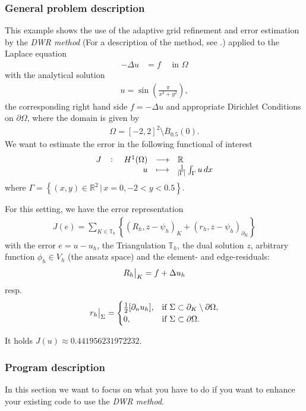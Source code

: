 \subsubsection{General problem description}
This example shows the use of the adaptive grid refinement and error estimation by the \textit{DWR method} (For a description of the method, see \cite{BR03}.) applied to the Laplace equation 
\begin{align*}
-\Delta u &= f \quad\text{ in } \Omega
\end{align*}
with the analytical solution
\begin{align*}
u = \sin\left(\frac{\pi}{x^2 + y^2}\right),
\end{align*}
 the corresponding right hand side $f = -\Delta u$ and appropriate Dirichlet Conditions on $\partial \Omega$, where the domain is given by
\begin{align*}
\Omega = [-2,2]^2\setminus \overline{B}_{0.5}(0).
\end{align*}
We want to estimate the error in the following functional of interest
$$\fullfunction{J}{H^1(\Omega)}{\mathbb{R}}{u}{\frac 1 {\abs{\Gamma}} \int_\Gamma u \,dx}$$
where
$\Gamma = \left\{(x,y)\in \mathbb R ^2\,\big | \,x=0,-2<y<0.5 \right \}$.

For this setting, we have the error representation
\begin{align}\label{dwr.error_identity}
J(e)=\sum_{K\in \mathbb T _h} \left\{(R_h, z-\psi_h)_K + (r_h, z-\psi_h)_{\partial_K}\right\}
\end{align}
with the error $e=u-u_h$, the Triangulation $\mathbb T_h$, the dual solution $z$, arbitrary function $\phi_h \in V_h$ (the ansatz space) and the element- and edge-residuals: 
\begin{align}\label{dwr.element_residual}
\eval[1]{R_h}_{K} = f+\Delta u_h
\end{align}
resp. 
\begin{align}\label{dwr.edge_residual}
\eval[1]{r_h}_{\Sigma} =
\begin{cases}
\frac 12 [\partial_n u_h] ,&\text{if } \Sigma \subset \partial_K \setminus \partial \Omega,\\
0,& \text{if } \Sigma \subset\partial \Omega.
\end{cases}
\end{align}

It holds $J(u) \approx 0.441956231972232$.
\subsubsection{Program description}
In this section we want to focus on what you have to do if you want to enhance your existing code to use the \textit{DWR method}.


